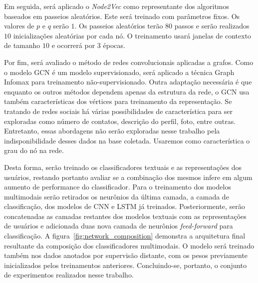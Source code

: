 Em seguida, será aplicado o \textit{Node2Vec} como representante dos algoritmos baseados
em passeios aleatórios.
Este será treinado com parâmetros fixos.
Os valores de $p$ e $q$ serão $1$.
Os passeios aleatórios terão $80$ passos e serão realizados $10$ inicializações
aleatórias por cada nó.
O treinamento usará janelas de contexto de tamanho $10$ e ocorrerá por
$3$ épocas.

Por fim, será avaliado o método de redes convolucionais aplicadas a grafos.
Como o modelo GCN é um modelo supervisionado, será aplicado a técnica Graph
Infomax para treinamento não-supervisionado.
Outra adaptação necessária é que enquanto os outros métodos dependem apenas da
estrutura da rede, o GCN usa também características dos vértices para
treinamento da representação.
Se tratando de redes sociais há várias possibilidades de característica para ser
exploradas como número de contatos, descrição do perfil, foto, entre outras.
Entretanto, essas abordagens não serão exploradas nesse trabalho pela
indisponibilidade desses dados na base coletada. Usaremos como característica
o grau do nó na rede.

Desta forma, serão treinado os classificadores textuais e as representações
dos usuários, restando portanto avaliar se a combinação dos mesmos infere
em algum aumento de performance do classificador.
Para o treinamento dos modelos multimodais serão retirados os neurônios da última
camada, a camada de classificação, dos modelos de CNN e LSTM já treinados.
Posteriormente, serão concatenadas as camadas restantes dos modelos textuais com as
representações de usuários e adicionada duas nova camada de neurônios \textit{feed-forward}
para classificação.
A figura~\ref{fig:network_composition} demonstra a arquitetura final resultante
da composição dos classificadores multimodais.
O modelo será treinado também nos dados anotados por supervisão distante, com
os pesos previamente inicializados pelos treinamentos anteriores.
Concluindo-se, portanto, o conjunto de experimentos realizados nesse trabalho.

